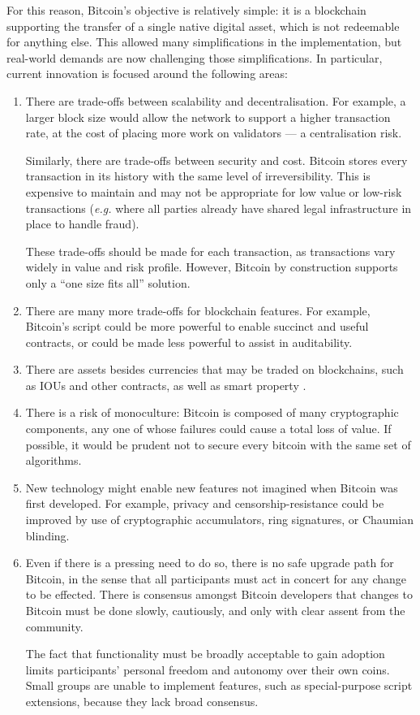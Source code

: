 \documentclass[letterpaper]{article}
\begin{document}
For this reason, Bitcoin's objective is relatively simple: it is a blockchain
supporting the transfer of a single native digital asset, which is not redeemable
for anything else. This allowed
many simplifications in the implementation, but real-world demands are now challenging
those simplifications. In particular, current innovation is focused
around the following areas:
\begin{enumerate}
\item There are trade-offs between scalability and decentralisation. For example,
a larger block size would allow the network to support a higher transaction rate, at
the cost of placing more work on validators --- a centralisation risk.

Similarly, there are trade-offs between security and cost. Bitcoin
stores every transaction in its history with the same level of irreversibility.
This is expensive to maintain and may not be appropriate for low value
or low-risk transactions (\emph{e.g.} where all parties already have shared
legal infrastructure in place to handle fraud).

These trade-offs should be made for each
transaction, as transactions vary widely in value and risk profile. However, Bitcoin by
construction supports only a ``one size fits all'' solution.
\item There are many more trade-offs for blockchain features. For example, Bitcoin's
script could be more powerful to enable succinct and useful contracts, or could be
made less powerful to assist in auditability.

\item There are assets besides currencies that may be traded on
blockchains, such as IOUs and other contracts, as well as smart property \cite{szabo1997}.

\item There is a risk of monoculture: Bitcoin is composed of many cryptographic
components, any one of whose failures could cause a total loss of value. If
possible, it would be prudent not to secure every bitcoin with the same set
of algorithms.

\item New technology might enable new features not imagined when Bitcoin was
first developed. For example, privacy and censorship-resistance could be improved by
use of cryptographic accumulators\cite{mouton2013}, ring signatures\cite{vansaberhagen2013},
or Chaumian blinding\cite{chaum1983}.
\item Even if there is a pressing need to do so, there is no safe upgrade path for
Bitcoin, in the sense that all participants must act in concert for any change
to be effected. There is consensus amongst Bitcoin developers that changes to Bitcoin
must be done slowly, cautiously, and only with clear assent from the community.

The fact that functionality must be broadly acceptable to gain adoption limits participants'
personal freedom and autonomy over their own coins. Small groups are unable to implement features,
such as special-purpose script extensions\cite{jl20122013}, because they lack
broad consensus.

\end{enumerate}
\end{document}
